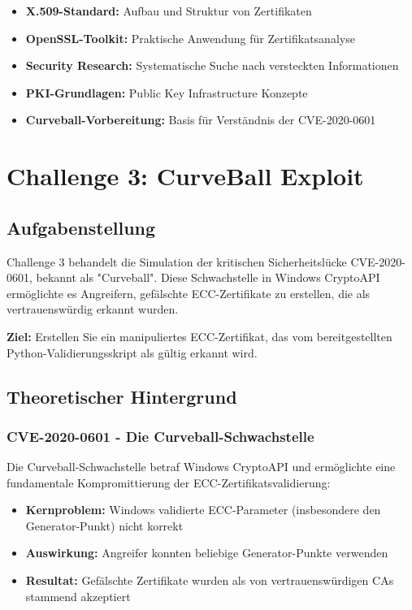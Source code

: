\documentclass{article}
\begin{document}
\begin{itemize}
    \item \textbf{X.509-Standard:} Aufbau und Struktur von Zertifikaten
    \item \textbf{OpenSSL-Toolkit:} Praktische Anwendung für Zertifikatsanalyse
    \item \textbf{Security Research:} Systematische Suche nach versteckten Informationen
    \item \textbf{PKI-Grundlagen:} Public Key Infrastructure Konzepte
    \item \textbf{Curveball-Vorbereitung:} Basis für Verständnis der CVE-2020-0601
\end{itemize}

\section{Challenge 3: CurveBall Exploit}

\subsection{Aufgabenstellung}

Challenge 3 behandelt die Simulation der kritischen Sicherheitslücke CVE-2020-0601, bekannt als "Curveball". Diese Schwachstelle in Windows CryptoAPI ermöglichte es Angreifern, gefälschte ECC-Zertifikate zu erstellen, die als vertrauenswürdig erkannt wurden.

\textbf{Ziel:} Erstellen Sie ein manipuliertes ECC-Zertifikat, das vom bereitgestellten Python-Validierungsskript als gültig erkannt wird.

\subsection{Theoretischer Hintergrund}

\subsubsection{CVE-2020-0601 - Die Curveball-Schwachstelle}

Die Curveball-Schwachstelle betraf Windows CryptoAPI und ermöglichte eine fundamentale Kompromittierung der ECC-Zertifikatsvalidierung:

\begin{itemize}
    \item \textbf{Kernproblem:} Windows validierte ECC-Parameter (insbesondere den Generator-Punkt) nicht korrekt
    \item \textbf{Auswirkung:} Angreifer konnten beliebige Generator-Punkte verwenden
    \item \textbf{Resultat:} Gefälschte Zertifikate wurden als von vertrauenswürdigen CAs stammend akzeptiert
\end{itemize}
\end{document}

